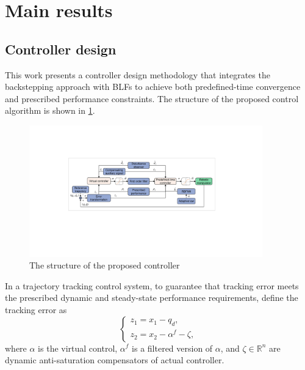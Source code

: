 \documentclass[pdflatex,sn-mathphys-num]{sn-jnl}%
\theoremstyle{thmstyleone}%
\theoremstyle{thmstyletwo}%
\theoremstyle{thmstylethree}%
\begin{document}
\section{Main results}

\subsection{Controller design}
This work presents a controller design methodology that integrates the backstepping approach with BLFs to achieve both predefined-time convergence and prescribed performance constraints. The structure of the proposed control algorithm is shown in \cref{fig:2}.
\begin{figure}[H]
	\centering
	\includegraphics[width=0.9\textwidth]{fig2.pdf}
	\caption{The structure of the proposed controller}
	\label{fig:2}
\end{figure}



\par In a trajectory tracking control system, to  guarantee that tracking error meets the prescribed dynamic and steady-state performance requirements, define the tracking error as
\begin{equation}\label{eq:20}
	\begin{cases}
		z_{1} = x_{1} - q_{d}, \\
	  z_{2} = x_{2} -\alpha^{f}-\zeta,
	\end{cases}
	\end{equation}
	where $\alpha$ is the virtual control, $\alpha^{f}$ is a filtered version of ${\alpha}$, and $\zeta \in\mathbb{R}^{n}$ are dynamic anti-saturation compensators of actual controller.
\end{document}
